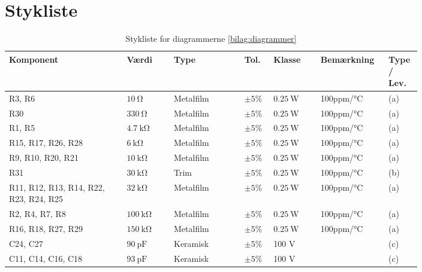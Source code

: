 \chapter{Stykliste} \label{bilag:styklister}
\begin{table}[h!]
\small
\caption{Stykliste for diagrammerne \ref{bilag:diagrammer}}
\label{tab:styklister}
\begin{threeparttable}
\begin{tabular}{p{0.25\linewidth}p{0.1\linewidth}p{0.15\linewidth}p{0.05\linewidth}p{0.1\linewidth}p{0.1\linewidth}p{0.05\linewidth}}
\toprule
\multicolumn{1}{l}{\textbf{Komponent}}       &
\multicolumn{1}{l}{\textbf{Værdi}}       &
\multicolumn{1}{l}{\textbf{Type}}       &
\multicolumn{1}{l}{\textbf{Tol.}} &
\multicolumn{1}{l}{\textbf{Klasse}} &
\multicolumn{1}{l}{\textbf{Bemærkning}} &
\multicolumn{1}{l}{\textbf{Type / Lev.}}  \\ 
\hline
R3, R6 & $\SI{10}{\ohm}$ & Metalfilm & $\pm 5\%$ & $\SI{0.25}{\watt}$ & 100ppm/\si{\celsius} & (a) \\
R30 & $\SI{330}{\ohm}$ & Metalfilm	& $\pm 5\%$ & $\SI{0.25}{\watt}$ & 100ppm/\si{\celsius}  & (a) \\
R1, R5 & $\SI{4.7}{\kilo\ohm}$ & Metalfilm	& $\pm 5\%$ & $\SI{0.25}{\watt}$ & 100ppm/\si{\celsius} & (a) \\
R15, R17, R26, R28 & $\SI{6}{\kilo\ohm}$ & Metalfilm & $\pm 5\%$ & $\SI{0.25}{\watt}$ & 100ppm/\si{\celsius} & (a) \\
R9, R10, R20, R21 & $\SI{10}{\kilo\ohm}$ & Metalfilm & $\pm 5\%$ & $\SI{0.25}{\watt}$ & 100ppm/\si{\celsius} & (a) \\
R31 & $\SI{30}{\kilo\ohm}$ & Trim & $\pm 5\%$ & $\SI{0.25}{\watt}$ & 100ppm/\si{\celsius} & (b) \\
R11, R12, R13, R14, R22, R23, R24, R25 & $\SI{32}{\kilo\ohm}$ & Metalfilm & $\pm 5\%$ & $\SI{0.25}{\watt}$ & 100ppm/\si{\celsius} & (a) \\
R2, R4, R7, R8 & $\SI{100}{\kilo\ohm}$ & Metalfilm & $\pm 5\%$ & $\SI{0.25}{\watt}$ & 100ppm/\si{\celsius} & (a) \\
R16, R18, R27, R29 & $\SI{150}{\kilo\ohm}$ & Metalfilm	& $\pm 5\%$ & $\SI{0.25}{\watt}$ & 100ppm/\si{\celsius} & (a) \\
\midrule
C24, C27 & $\SI{90}{\pico\farad}$ & Keramisk & $\pm 5\%$ & 100 \si{\volt} &  & (c)\\
C11, C14, C16, C18 & $\SI{93}{\pico\farad}$ & Keramisk & $\pm 5\%$ & 100 \si{\volt} &  & (c)\\

\end{tabular}
\end{threeparttable}
\end{table}
